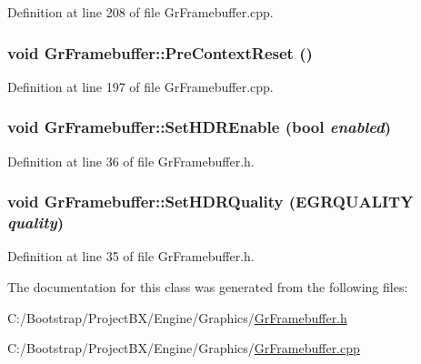 Definition at line 208 of file GrFramebuffer.cpp.\hypertarget{class_gr_framebuffer_0c735a474f9888324ca016596d5a8a85}{
\subsubsection[{PreContextReset}]{\setlength{\rightskip}{0pt plus 5cm}void GrFramebuffer::PreContextReset ()}}
\label{class_gr_framebuffer_0c735a474f9888324ca016596d5a8a85}




Definition at line 197 of file GrFramebuffer.cpp.\hypertarget{class_gr_framebuffer_8977d79d6a403f383c9fb98966366aa4}{
\subsubsection[{SetHDREnable}]{\setlength{\rightskip}{0pt plus 5cm}void GrFramebuffer::SetHDREnable (bool {\em enabled})}}
\label{class_gr_framebuffer_8977d79d6a403f383c9fb98966366aa4}




Definition at line 36 of file GrFramebuffer.h.\hypertarget{class_gr_framebuffer_68bc3b696f651f9c4a24834fc0f8c5ea}{
\subsubsection[{SetHDRQuality}]{\setlength{\rightskip}{0pt plus 5cm}void GrFramebuffer::SetHDRQuality ({\bf EGRQUALITY} {\em quality})}}
\label{class_gr_framebuffer_68bc3b696f651f9c4a24834fc0f8c5ea}




Definition at line 35 of file GrFramebuffer.h.

The documentation for this class was generated from the following files:\begin{CompactItemize}
\item 
C:/Bootstrap/ProjectBX/Engine/Graphics/\hyperlink{_gr_framebuffer_8h}{GrFramebuffer.h}\item 
C:/Bootstrap/ProjectBX/Engine/Graphics/\hyperlink{_gr_framebuffer_8cpp}{GrFramebuffer.cpp}\end{CompactItemize}
